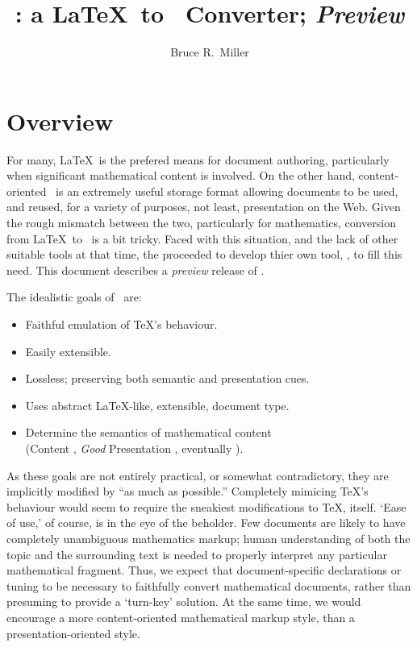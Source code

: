 \documentclass{article}
\title{\LaTeXML: a \LaTeX\ to \XML\ Converter; \emph{Preview}}
\author{Bruce R.~Miller}
\begin{document}
\maketitle
\section{Overview}
For many, \LaTeX\ is the prefered means for document authoring, particularly when
significant mathematical content is involved.
On the other hand, content-oriented \XML\ is an extremely useful storage format
allowing documents to be used, and reused, for a variety of purposes, not least, 
presentation on the Web.  Given the rough mismatch between the two,
particularly for mathematics, conversion  from \LaTeX\ to \XML\ is a bit tricky.
Faced with this situation, and the lack of other suitable tools at that time,
the 
proceeded to develop thier own tool, \LaTeXML, to fill this need.
This document describes a \emph{preview} release of \LaTeXML.

The idealistic goals of \LaTeXML\ are:
\begin{itemize}
\item Faithful emulation of \TeX's behaviour.
\item Easily extensible.
\item Lossless; preserving both semantic and presentation cues.
\item Uses abstract \LaTeX-like, extensible, document type.
\item Determine the semantics of mathematical content\\
    (Content \MathML, \emph{Good} Presentation \MathML, eventually \OpenMath).
\end{itemize}

As these goals are not entirely practical, or somewhat contradictory,
they are implicitly modified by ``as much as possible.''
Completely mimicing \TeX's behaviour would seem to require the sneakiest modifications
to \TeX, itself.  `Ease of use,' of course, is in the eye of the beholder.
Few documents are likely to have completely unambiguous mathematics markup; 
human understanding of both the topic and the surrounding text is needed to
properly interpret any particular mathematical fragment.
Thus, we expect that document-specific declarations or tuning to be necessary
to faithfully convert mathematical documents, rather than presuming to
provide a `turn-key' solution. At the same time, we would encourage
a more content-oriented mathematical markup style, than a presentation-oriented style.
\end{document}
